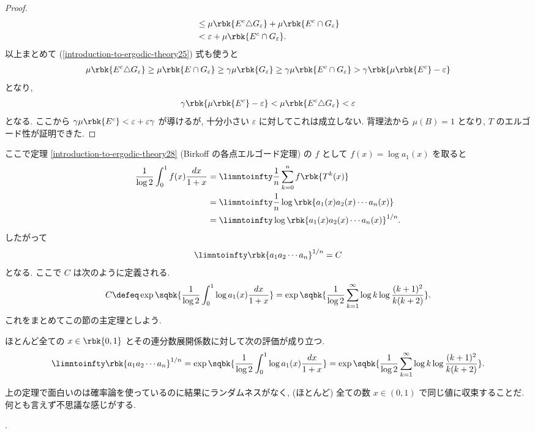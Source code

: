 \documentclass[openany, a4paper, oneside]{jsbook}
\begin{document}
{\begin{proof}
\begin{align}
 &\leq
 \mu \rbk{E^c \triangle G_{\varepsilon}} + \mu \rbk{E^c \cap G_{\varepsilon}} \\
 &<
 \varepsilon + \mu \rbk{E^c \cap G_{\varepsilon}}.
\end{align}
以上まとめて (\ref{introduction-to-ergodic-theory25}) 式も使うと
\begin{align}
 \mu \rbk{E^c \triangle G_{\varepsilon}}
 \geq
 \mu \rbk{E \cap G_{\varepsilon}}
 \geq
 \gamma \mu \rbk{G_{\varepsilon}}
 \geq
 \gamma \mu \rbk{E^c \cap G_{\varepsilon}}
 >
 \gamma \rbk{\mu \rbk{E^c} - \varepsilon}
\end{align}
となり,
\begin{align}
 \gamma \rbk{\mu \rbk{E^c} - \varepsilon}
 <
 \mu \rbk{E^c \triangle G_{\varepsilon}}
 <
 \varepsilon
\end{align}
となる.
ここから $\gamma \mu \rbk{E^c} < \varepsilon + \varepsilon \gamma$ が導けるが,
十分小さい $\varepsilon$ に対してこれは成立しない.
背理法から $\mu (B) = 1$ となり, $T$ のエルゴード性が証明できた.
\end{proof}

ここで定理 \ref{introduction-to-ergodic-theory28} (Birkoff の各点エルゴード定理) の
$f$ として $f(x) = \log a_1(x)$ を取ると
\begin{align}
 \frac{1}{\log 2} \int_0^1 f(x) \frac{dx}{1+x}
 &=
 \limntoinfty \frac{1}{n} \sum_{k=0}^n f \rbk{T^k(x)} \\
 &=
 \limntoinfty \frac{1}{n} \log \rbk{a_1(x) a_2(x) \cdots a_n(x)} \\
 &=
 \limntoinfty \log \rbk{a_1(x) a_2(x) \cdots a_n(x)}^{1/n}.
\end{align}
したがって
\begin{align}
 \limntoinfty \rbk{a_1 a_2 \cdots a_n}^{1/n}
 =
 C
\end{align}
となる.
ここで $C$ は次のように定義される.
\begin{align}
 C
 \defeq
 \exp \sqbk{\frac{1}{\log 2} \int_0^1 \log a_1(x) \frac{dx}{1+x}}
 =
 \exp \sqbk{\frac{1}{\log 2} \sum_{k=1}^{\infty} \log k \log \frac{(k+1)^2}{k (k+2)}}.
\end{align}
これをまとめてこの節の主定理としよう.
\begin{thm}
ほとんど全ての $x \in \rbk{0,1}$ とその連分数展開係数に対して次の評価が成り立つ.
\begin{align}
 \limntoinfty \rbk{a_1 a_2 \cdots a_n}^{1/n}
 =
 \exp \sqbk{\frac{1}{\log 2} \int_0^1 \log a_1(x) \frac{dx}{1+x}}
 =
 \exp \sqbk{\frac{1}{\log 2} \sum_{k=1}^{\infty} \log k \log \frac{(k+1)^2}{k (k+2)}}.
\end{align}
\end{thm}
\begin{rem}
上の定理で面白いのは確率論を使っているのに結果にランダムネスがなく,
(ほとんど) 全ての数 $x \in (0, 1)$ で同じ値に収束することだ.
何とも言えず不思議な感じがする.
\end{rem}}.
\end{document}
